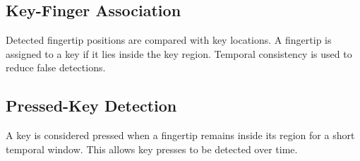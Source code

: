 \subsection{Key-Finger Association}

Detected fingertip positions are compared with key locations.
A fingertip is assigned to a key if it lies inside the key region.
Temporal consistency is used to reduce false detections.

\subsection{Pressed-Key Detection}

A key is considered pressed when a fingertip remains
inside its region for a short temporal window.
This allows key presses to be detected over time.
